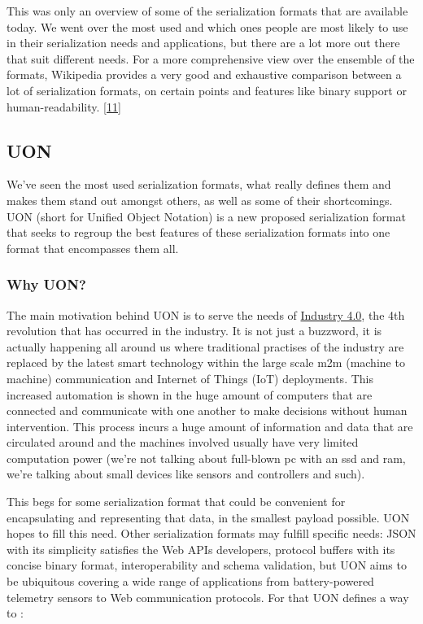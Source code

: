 \documentclass[12pt]{article}
\begin{document}
This was only an overview of some of the serialization formats that are available today. We went over the most used and which ones people are most likely to use in their serialization needs and applications, but there are a lot more out there that suit different needs. For a more comprehensive view over the ensemble of the formats, Wikipedia provides a very good and exhaustive comparison between a lot of serialization formats, on certain points and features like binary support or human-readability. \href{https://en.wikipedia.org/wiki/Comparison_of_data-serialization_formats}{[11]}

\pagebreak

\subsection{UON}
We’ve seen the most used serialization formats, what really defines them and makes them stand out amongst others, as well as some of their shortcomings. UON (short for Unified Object Notation) is a new proposed serialization format that seeks to regroup the best features of these serialization formats into one format that encompasses them all. 

\subsubsection{Why UON?}
The main motivation behind UON is to serve the needs of \href{https://en.wikipedia.org/wiki/Industry_4.0}{Industry 4.0}, the 4th revolution that has occurred in the industry. It is not just a buzzword, it is actually happening all around us where traditional practises of the industry are replaced by the latest smart technology within the large scale m2m (machine to machine) communication and Internet of Things (IoT) deployments. This increased automation is shown in the huge amount of computers that are connected and communicate with one another to make decisions without human intervention. This process incurs a huge amount of information and data that are circulated around and the machines involved usually have very limited computation power (we’re not talking about full-blown pc with an ssd and ram, we’re talking about small devices like sensors and controllers and such). 

This begs for some serialization format that could be convenient for encapsulating and representing that data, in the smallest payload possible.
UON hopes to fill this need. Other serialization formats may fulfill specific needs:  JSON with its simplicity satisfies the Web APIs developers, protocol buffers with its concise binary format, interoperability and schema validation, but UON aims to be ubiquitous covering a wide range of applications from battery-powered telemetry sensors to Web communication protocols. For that UON defines a way to :
\end{document}
